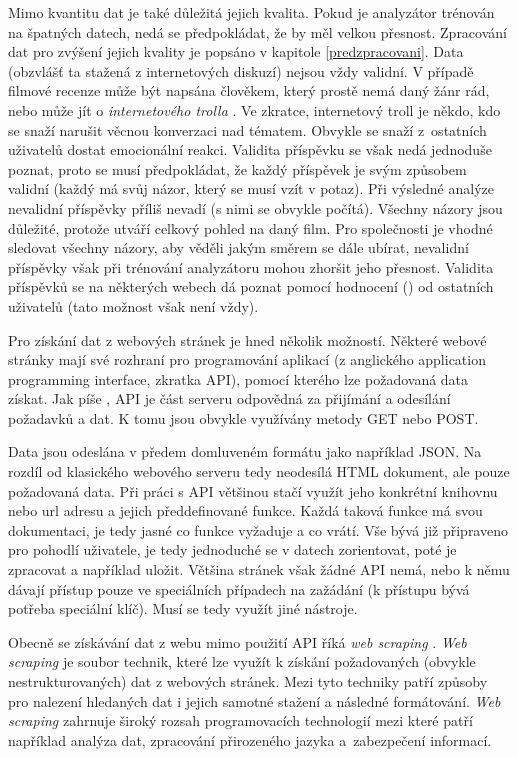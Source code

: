 Mimo kvantitu dat je také důležitá jejich kvalita. Pokud je analyzátor trénován na špatných datech, nedá se předpokládat, že by měl velkou přesnost. Zpracování dat pro zvýšení jejich kvality je popsáno v kapitole \ref{predzpracovani}. Data (obzvlášť ta stažená z internetových diskuzí) nejsou vždy validní. V případě filmové recenze může být napsána člověkem, který prostě nemá daný žánr rád, nebo může jít o \emph{internetového trolla} \cite{televize}. Ve zkratce, internetový troll je někdo, kdo se snaží narušit věcnou konverzaci nad tématem. Obvykle se snaží z~ostatních uživatelů dostat emocionální reakci.
Validita příspěvku se však nedá jednoduše poznat, proto se musí předpokládat, že každý příspěvek je svým způsobem validní (každý má svůj názor, který se musí vzít v potaz). Při výsledné analýze nevalidní příspěvky příliš nevadí (s nimi se obvykle počítá). Všechny názory jsou důležité, protože utváří celkový pohled na daný film. Pro společnosti je vhodné sledovat všechny názory, aby věděli jakým směrem se dále ubírat, nevalidní příspěvky však při trénování analyzátoru mohou zhoršit jeho přesnost. Validita příspěvků se na některých webech dá poznat pomocí hodnocení () od ostatních uživatelů (tato možnost však není vždy).  

Pro získání dat z webových stránek je hned několik možností. Některé webové stránky mají své rozhraní pro programování aplikací (z anglického application programming interface, zkratka API), pomocí kterého lze požadovaná data získat. Jak píše \cite{webscraping}, API je část serveru odpovědná za přijímání a odesílání požadavků a dat. K tomu jsou obvykle využívány metody GET nebo POST. 

Data jsou odeslána v předem domluveném formátu jako například JSON. Na rozdíl od klasického webového serveru tedy neodesílá HTML dokument, ale pouze požadovaná data.
Při práci s API většinou stačí využít jeho konkrétní knihovnu nebo url adresu a jejich předdefinované funkce. Každá taková funkce má svou dokumentaci, je tedy jasné co funkce vyžaduje a co vrátí. Vše bývá již připraveno pro pohodlí uživatele, je tedy jednoduché se v datech zorientovat, poté je zpracovat a například uložit. Většina stránek však žádné API nemá, nebo k němu dávají přístup pouze ve speciálních případech na zažádání (k přístupu bývá potřeba speciální klíč).
Musí se tedy využít jiné nástroje. 

Obecně se získávání dat z webu mimo použití API říká \emph{web scraping} \cite{webscraping}. \emph{Web scraping} je soubor technik, které lze využít k získání požadovaných (obvykle nestrukturovaných) dat z webových stránek. Mezi tyto techniky patří způsoby pro nalezení hledaných dat i jejich samotné stažení a následné formátování. \emph{Web scraping} zahrnuje široký rozsah programovacích technologií mezi které patří například analýza dat, zpracování přirozeného jazyka a~zabezpečení informací.

